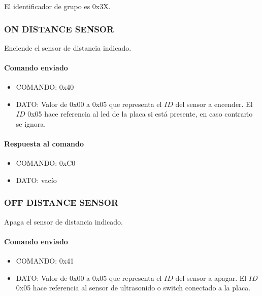 El identificador de grupo es 0x3X.

\subsubsection{ON DISTANCE SENSOR}
\label{hA_protocolo_on_distance_sensor}

Enciende el sensor de distancia indicado.

\paragraph*{Comando enviado}

\begin{itemize}
	\item{COMANDO:} 0x40
	\item{DATO:} Valor de 0x00 a 0x05 que representa el $ID$ del sensor a encender.
	El $ID$ 0x05 hace referencia al led de la placa si est\'a presente, en caso contrario se ignora.
\end{itemize}

\paragraph*{Respuesta al comando}

\begin{itemize}
	\item{COMANDO:} 0xC0
	\item{DATO:} vac\'io
\end{itemize}

\subsubsection{OFF DISTANCE SENSOR}
\label{hA_protocolo_off_distance_sensor}

Apaga el sensor de distancia indicado.

\paragraph*{Comando enviado}

\begin{itemize}
	\item{COMANDO:} 0x41
	\item{DATO:} Valor de 0x00 a 0x05 que representa el $ID$ del sensor a apagar.
	El $ID$ 0x05 hace referencia al sensor de ultrasonido o switch conectado a la placa.
\end{itemize}

